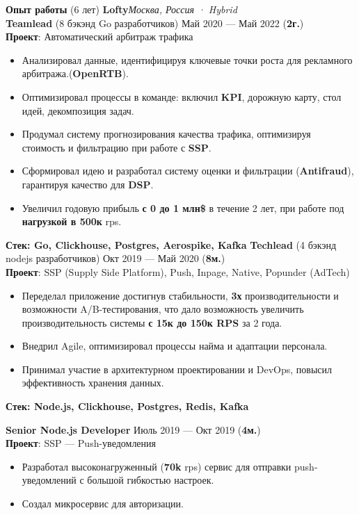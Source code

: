 \documentclass{resume}
\begin{document}
\begin{rSection}{\textbf{Опыт работы} (6 лет) }
    \textbf{Lofty}\hfill \textit{Москва, Россия · Hybrid} \\
    \textbf{Teamlead} (8 бэкэнд Go разработчиков) \hfill Май 2020 --- Май 2022 ({\textbf{2г.}}) \\
    \textbf{Проект}: Автоматический арбитраж трафика
    \begin{itemize}
        \item Анализировал данные, идентифицируя ключевые точки роста для рекламного арбитража.(\textbf{OpenRTB})\@.
        \item Оптимизировал процессы в команде: включил \textbf{KPI}, дорожную карту, стол идей, декомпозиция задач\@.
        \item Продумал систему прогнозирования качества трафика, оптимизируя стоимость и фильтрацию при работе с \textbf{SSP}\@.
        \item Сформировал идею и разработал систему оценки и фильтрации (\textbf{Antifraud}), гарантируя качество для \textbf{DSP}\@.
        \item Увеличил годовую прибыль \textbf{с 0 до 1 млн\$} в течение 2 лет, при работе под \textbf{нагрузкой в 500к} rps\@.
    \end{itemize}
    \textbf{Стек: Go, Clickhouse, Postgres, Aerospike, Kafka}
\clearpage
    \textbf{Techlead} (4 бэкэнд nodejs разработчиков) \hfill Окт 2019 --- Май 2020 ({\textbf{8м.}}) \\
    \textbf{Проект}: SSP (Supply Side Platform), Push, Inpage, Native, Popunder (AdTech)
    \begin{itemize}
        \item Переделал приложение достигнув стабильности, \textbf{3х} производительности и возможности A/B-тестирования,
        что дало возможность увеличить производительность системы \textbf{с 15к до 150к RPS} за 2 года\@.
        \item Внедрил Agile, оптимизировал процессы найма и адаптации персонала\@.
        \item Принимал участие в архитектурном проектировании и DevOps, повысил эффективность хранения данных\@.
    \end{itemize}
    \textbf{Стек: Node.js, Clickhouse, Postgres, Redis, Kafka}

    \textbf{Senior Node.js Developer} \hfill Июль 2019 --- Окт 2019 ({\textbf{4м.}}) \\
    \textbf{Проект}: SSP --- Push-уведомления
    \begin{itemize}
        \item Разработал высоконагруженный (\textbf{70k} rps) сервис для отправки push-уведомлений с большой гибкостью настроек\@.
        \item Создал микросервис для авторизации\@.
    \end{itemize}


\end{rSection}
\end{document}
